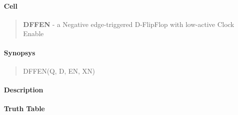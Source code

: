 \label{DFFEN}
\paragraph{Cell}
\begin{quote}
    \textbf{DFFEN} - a Negative edge-triggered D-FlipFlop with low-active Clock Enable
\end{quote}

\paragraph{Synopsys}
\begin{quote}
    DFFEN(Q, D, EN, XN)
\end{quote}

\paragraph{Description}

%

\paragraph{Truth Table}
%

